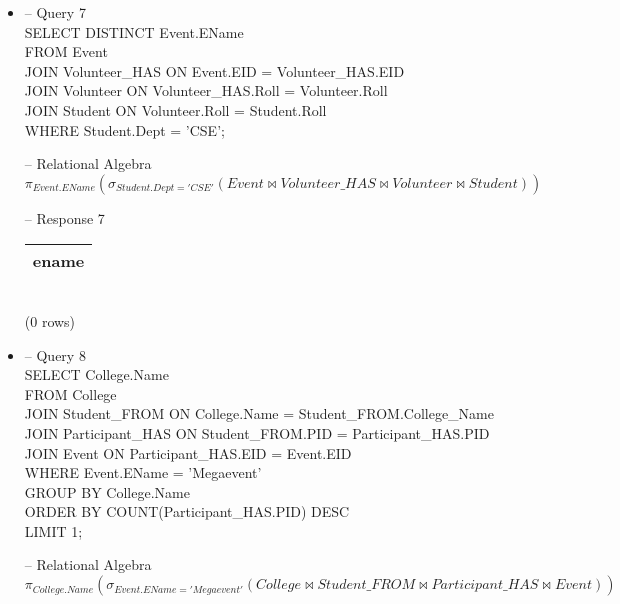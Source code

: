 \documentclass[7pt]{article}
\begin{document}
\begin{itemize}
    -- Response 6 \\
    \begin{tabular}{|c|}
        \hline
        name \\
        \hline
    \end{tabular} \\
    (0 rows)

    \item -- Query 7 \\
    SELECT DISTINCT Event.EName \\
    FROM Event  \\
    JOIN Volunteer\_HAS ON Event.EID = Volunteer\_HAS.EID \\
    JOIN Volunteer ON Volunteer\_HAS.Roll = Volunteer.Roll   \\
    JOIN Student ON Volunteer.Roll = Student.Roll   \\
    WHERE Student.Dept = 'CSE'; \vspace{2pt}

    -- Relational Algebra \\
    $\pi_{Event.EName}(\sigma_{Student.Dept = 'CSE'}(Event \bowtie Volunteer\_HAS \bowtie Volunteer \bowtie Student))$ \vspace{2pt}

    -- Response 7 \\
    \begin{tabular}{|c|}
        \hline
        ename \\
        \hline
    \end{tabular} \\
    (0 rows)

    \item -- Query 8 \\
    SELECT College.Name \\
    FROM College    \\
    JOIN Student\_FROM ON College.Name = Student\_FROM.College\_Name   \\
    JOIN Participant\_HAS ON Student\_FROM.PID = Participant\_HAS.PID  \\
    JOIN Event ON Participant\_HAS.EID = Event.EID   \\
    WHERE Event.EName = 'Megaevent' \\
    GROUP BY College.Name   \\
    ORDER BY COUNT(Participant\_HAS.PID) DESC    \\
    LIMIT 1;    \vspace{2pt}

    -- Relational Algebra \\
    $\pi_{College.Name}(\sigma_{Event.EName = 'Megaevent'}(College \bowtie Student\_FROM \bowtie Participant\_HAS \bowtie Event))$ \vspace{2pt}


\end{itemize}
\end{document}

